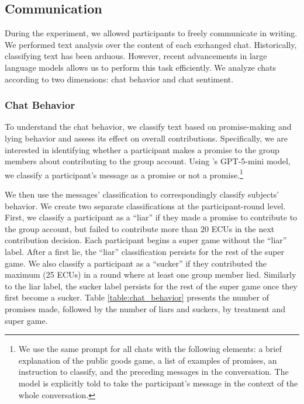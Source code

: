 \documentclass[12pt,letterpaper,english]{article}
\begin{document}
\newpage
\subsection{Communication}
During the experiment, we allowed participants to freely communicate in writing. We performed  text analysis over the content of each exchanged chat. Historically, classifying text has been arduous. However, recent advancements in large language models allows us to perform this task efficiently.
We analyze chats according to two dimensions: chat behavior and chat sentiment. 
\subsubsection{Chat Behavior}
To understand the chat behavior, we classify text based on promise-making and lying behavior and assess its effect on overall contributions. Specifically, we are interested in identifying whether a participant makes a promise to the  group members about contributing to the group account. Using \cite{openai_gpt5mini_2025}'s GPT-5-mini model, we classify a participant's message as a promise or not a promise.\footnote{ We use the same prompt for all chats with the following elements: a brief explanation of the public goods game, a list of examples of promises, an instruction to classify, and the 
preceding messages in the conversation. The model is explicitly told to take the participant's message in the context of the whole conversation.}

We then use the messages' classification to correspondingly classify subjects' behavior. We create two separate classifications at the participant-round level. First, we classify a participant as a ``liar'' if they made a promise to contribute to the group account, but failed to contribute more than 20 ECUs in the next contribution decision. Each participant begins a super game without the ``liar'' label. After a first lie, the  ``liar'' classification persists for the rest of the super game. We also classify a participant as a ``sucker'' if they contributed the maximum (25 ECUs) in a round where at least one group member lied. Similarly to the liar label, the sucker label persists for the rest of the super game once they first become a sucker. Table \ref{table:chat_behavior} presents the number of promises made, followed by the number of liars and suckers, by treatment and super game. \\
\begin{table}[htbp]
    \centering \footnotesize
    
    \caption{Distribution of liars and suckers across treatments and supergames}
    \label{table:chat_behavior}
\end{table}
\end{document}
